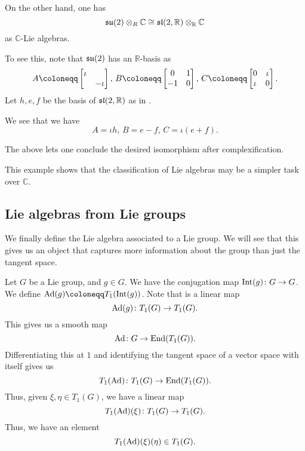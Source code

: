 \documentclass[12pt]{article}
\begin{document}
On the other hand, one has
\begin{equation*} 
	\su(2) \otimes_{R} \mathbb{C} \cong \sl(2, \mathbb{R}) \otimes_{\mathbb{R}} \mathbb{C}
\end{equation*}
as $\mathbb{C}$-Lie algebras.

To see this, note that $\su(2)$ has an $\mathbb{R}$-basis as
\begin{equation*} 
	A \coloneqq \two{\iota}{}{}{-\iota},\, B \coloneqq \two{0}{1}{-1}{0},\, C \coloneqq \two{0}{\iota}{\iota}{0}.
\end{equation*}
Let $h, e, f$ be the basis of $\sl(2, \mathbb{R})$ as in . 

We see that we have
\begin{equation*} 
	A = \iota h,\, B = e - f,\, C = \iota(e + f).
\end{equation*}

The above lets one conclude the desired isomorphism after complexification.

This example shows that the classification of Lie algebras may be a simpler task over $\mathbb{C}$.

\subsection{Lie algebras from Lie groups}

We finally define the Lie algebra associated to a Lie group. 
We will see that this gives us an object that captures more information about the group than just the tangent space.

Let $G$ be a Lie group, and $g \in G$. 
We have the conjugation map $\INT(g) \colon G \to G$. 
We define $\Ad(g) \coloneqq T_{1}(\INT(g))$. 
Note that is a linear map
\begin{equation*} 
	\Ad(g) \colon T_{1}(G) \to T_{1}(G).
\end{equation*}
This gives us a smooth map
\begin{equation*} 
	\Ad \colon G \to \End(T_{1}(G)).
\end{equation*}
Differentiating this at $1$ and identifying the tangent space of a vector space with itself gives us
\begin{equation} \label{eq:t1-ad-t1-G-end-t1-G}
	T_{1}(\Ad) \colon T_{1}(G) \to \End(T_{1}(G)).
\end{equation}
Thus, given $\xi, \eta \in T_{1}(G)$, we have a linear map
\begin{equation*} 
	T_{1}(\Ad)(\xi) \colon T_{1}(G) \to T_{1}(G).
\end{equation*}
Thus, we have an element
\begin{equation*} 
	T_{1}(\Ad)(\xi)(\eta) \in T_{1}(G).
\end{equation*}
\end{document}
